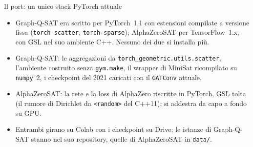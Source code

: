 \documentclass[aspectratio=169]{beamer}
\newcommand{\T}[2]{#2}
\newcommand{\T}[2]{#1}
\begin{document}
\begin{frame}{\T{The port: one current PyTorch stack}{Il port: un unico stack PyTorch attuale}}
  \begin{itemize}
    \item \T{Graph-Q-SAT was written for PyTorch~1.1 with pinned compiled extensions
          (\texttt{torch-scatter}, \texttt{torch-sparse}); AlphaZeroSAT for TensorFlow~1.x,
          with GSL in its C++ environment. Neither can be installed today.}%
          {Graph-Q-SAT era scritto per PyTorch~1.1 con estensioni compilate a versione fissa
          (\texttt{torch-scatter}, \texttt{torch-sparse}); AlphaZeroSAT per TensorFlow~1.x,
          con GSL nel suo ambiente C++. Nessuno dei due si installa pi\`u.}
    \item \T{Graph-Q-SAT: the aggregations from \texttt{torch\_geometric.utils.scatter}, the
          environment built without \texttt{gym.make}, the wrapper of MiniSat rebuilt against
          \texttt{numpy}~2, the checkpoints of 2021 loaded with the current \texttt{GATConv}.}%
          {Graph-Q-SAT: le aggregazioni da \texttt{torch\_geometric.utils.scatter}, l'ambiente
          costruito senza \texttt{gym.make}, il wrapper di MiniSat ricompilato su
          \texttt{numpy}~2, i checkpoint del 2021 caricati con il \texttt{GATConv} attuale.}
    \item \T{AlphaZeroSAT: the network and the AlphaZero loss rewritten in PyTorch, GSL removed
          (the Dirichlet noise from C++11 \texttt{<random>}); it trains end to end on a GPU.}%
          {AlphaZeroSAT: la rete e la loss di AlphaZero riscritte in PyTorch, GSL tolta (il
          rumore di Dirichlet da \texttt{<random>} del C++11); si addestra da capo a fondo su
          GPU.}
    \item \T{Both run on Colab with the checkpoints on Drive; the instances of Graph-Q-SAT live
          in its repository, those of AlphaZeroSAT in \texttt{data/}.}%
          {Entrambi girano su Colab con i checkpoint su Drive; le istanze di Graph-Q-SAT stanno
          nel suo repository, quelle di AlphaZeroSAT in \texttt{data/}.}
  \end{itemize}
\end{frame}
\end{document}
